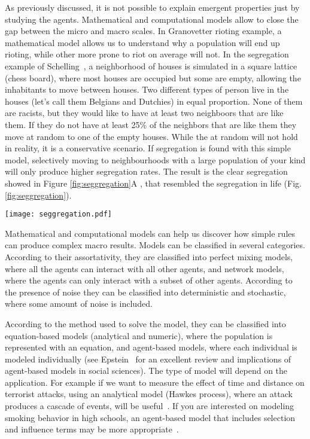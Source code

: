 As previously discussed, it is not possible to explain emergent properties just by studying the agents.
Mathematical and computational models allow to close the gap between the micro and macro scales.
In Granovetter rioting example, a mathematical model allows us to understand why a population will end up rioting, while other more prone to riot on average will not.
In the segregation example of Schelling~\citep{schelling2006}, 
a neighborhood of houses is simulated in a square lattice (chess board), 
where most houses are occupied but some are empty, 
allowing the inhabitants to move between houses.
Two different types of person live in the houses (let’s call them Belgians and Dutchies) in equal proportion.
None of them are racists, but they would like to have at least two neighboors that are like them.
If they do not have at least 25\% of the neighbors that are like them they move at random to one of the empty houses. 
While the at random will not hold in reality, it is a conservative scenario.
If segregation is found with this simple model, selectively moving to neighbourhoods with a large population of your kind will only produce higher segregation rates.
The result is the clear segregation showed in Figure \ref{fig:seggregation}A , that resembled the segregation in life (Fig. \ref{fig:seggregation}).


\begin{figure*}
\begin{center}
\texttt{[image: seggregation.pdf]}
\caption{Gwhite is pink (heavier concentrations look reddish), black is blue, Hispanic is orange, and Asian is green..}
\label{fig:seggregation}
\end{center}
\end{figure*}



Mathematical and computational models can help us discover how simple rules can produce complex macro results. 
Models can be classified in several categories. 
According to their assortativity, they are classified into 
perfect mixing models, where all the agents can interact with all other agents,
and network models, where the agents can only interact with a subset of other agents.
According to the presence of noise they can be classified into
deterministic and stochastic, where some amount of noise is included.

According to the method used to solve the model, they can be classified into
equation-based models (analytical and numeric), where the population is represented with an equation,
and agent-based models, where each individual is modeled individually (see Epstein~\citep{Epstein2006} for an excellent review and implications of agent-based models in social sciences).
The type of model will depend on the application.
For example if we want to measure the effect of time and distance on terrorist attacks,
using an analytical model (Hawkes process), where an attack produces a cascade of events, will be useful~\citep{garciab2015}.
If you are interested on modeling smoking behavior in high schools,
an agent-based model that includes selection and influence terms may be more appropriate~\citep{Mercken2010}.


